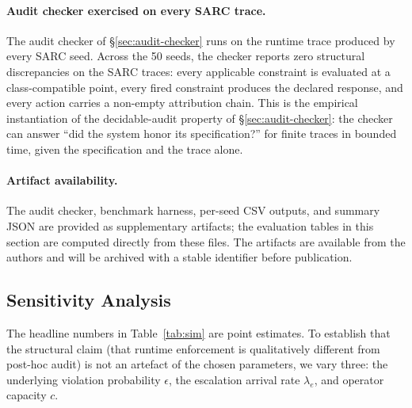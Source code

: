 \documentclass[11pt,a4paper]{article}
\theoremstyle{remark}
\begin{document}
\paragraph{Audit checker exercised on every SARC trace.} The audit checker of \S\ref{sec:audit-checker} runs on the runtime trace produced by every SARC seed. Across the 50 seeds, the checker reports zero structural discrepancies on the SARC traces: every applicable constraint is evaluated at a class-compatible point, every fired constraint produces the declared response, and every action carries a non-empty attribution chain. This is the empirical instantiation of the decidable-audit property of \S\ref{sec:audit-checker}: the checker can answer ``did the system honor its specification?'' for finite traces in bounded time, given the specification and the trace alone.

\paragraph{Artifact availability.} The audit checker, benchmark harness, per-seed CSV outputs, and summary JSON are provided as supplementary artifacts; the evaluation tables in this section are computed directly from these files. The artifacts are available from the authors and will be archived with a stable identifier before publication.

\subsection{Sensitivity Analysis}\label{sec:sensitivity}

The headline numbers in Table~\ref{tab:sim} are point estimates. To establish that the structural claim (that runtime enforcement is qualitatively different from post-hoc audit) is not an artefact of the chosen parameters, we vary three: the underlying violation probability $\epsilon$, the escalation arrival rate $\lambda_e$, and operator capacity $c$.
\end{document}
